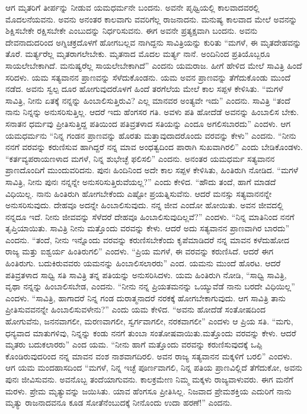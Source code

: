 ಆಗ ಮೃತರಿಗೆ ತೀರ್ಪನ್ನು ನೀಡುವ ಯಮಧರ್ಮನೇ ಬಂದನು. ಅವನೇ ಪೃಥ್ವಿಯಲ್ಲಿ ಕಾಲವಾದವರಲ್ಲಿ ಮೊದಲನೆಯವನು. ಅವನು ಅನಂತರ ಕಾಲವಾಗು ವವರಿಗೆಲ್ಲ ರಾಜನಾದನು. ಮನುಷ್ಯ ಕಾಲವಾದ ಮೇಲೆ ಅವನನ್ನು ಶಿಕ್ಷಿಸಬೇಕೇ ರಕ್ಷಿಸಬೇಕೇ ಎಂಬುದನ್ನು ನಿರ್ಧರಿಸುವನು. ಈಗ ಅವನೇ ಪ್ರತ್ಯಕ್ಷವಾಗಿ ಬಂದನು. ಅವನು ದೇವನಾದುದರಿಂದ ಅಗ್ನಿಚಕ್ರದೊಳಗೆ ಹೋಗಬಲ್ಲವ ನಾಗಿದ್ದನು ಸಾವಿತ್ರಿಯನ್ನು ಕುರಿತು “ಮಗಳೆ, ಈ ಮೃತದೇಹವನ್ನು ತೊರೆ. ಮರ್ತ್ಯರೆಲ್ಲ ಮೃತರಾಗಲೇಬೇಕು. ಮೃತನಾದ ಮೊದಲ ಮರ್ತ್ಯ ನಾನೆ. ಅಂದಿನಿಂದ ಪ್ರತಿಯೊಬ್ಬರೂ ಸಾಯಲೇಬೇಕಾಗಿದೆ. ಮನುಷ್ಯರೆಲ್ಲ ಸಾಯಲೇಬೇಕಾಗಿದೆ” ಎಂದನು ಯಮರಾಜ. ಹೀಗೆ ಹೇಳಿದ ಮೇಲೆ ಸಾವಿತ್ರಿ ಹಿಂದೆ ಸರಿದಳು. ಯಮ ಸತ್ಯವಾನನ ಪ್ರಾಣವನ್ನು ಸೆಳೆದುಕೊಂಡನು. ಯಮ ಅವನ ಪ್ರಾಣವನ್ನು ತೆಗೆದುಕೊಂಡು ಮುಂದೆ ನಡೆದ. ಅವನು ಸ್ವಲ್ಪ ದೂರ ಹೋಗುವುದರೊಳಗೆ ಹಿಂದೆ ತರಗೆಲೆಯ ಮೇಲೆ ಕಾಲ ಸಪ್ಪಳ ಕೇಳಿಸಿತು. “ಮಗಳೆ ಸಾವಿತ್ರಿ, ನೀನು ಏತಕ್ಕೆ ನನ್ನನ್ನು ಹಿಂಬಾಲಿಸುತ್ತಿರುವಿ? ಎಲ್ಲ ಮಾನವರ ಅಂತ್ಯವೇ ಇದು” ಎಂದನು. ಸಾವಿತ್ರಿ “ತಂದೆ ನಾನು ನಿನ್ನನ್ನು ಅನುಸರಿಸುತ್ತಿಲ್ಲ. ಆದರೆ ಇದು ಹೆಂಗಸರ ಗತಿ. ಅವಳು ಪತಿ ಹೋದೆಡೆ ಅವನನ್ನು ಹಿಂಬಾಲಿಸ ಬೇಕು. ಸನಾತನ ಧರ್ಮವು ಪ್ರೀತಿಸುತ್ತಿದ್ದ ಪತಿಯಿಂದ ಪತಿವ್ರತಳಾದ ಸತಿಯನ್ನು ಎಂದೂ ಅಗಲಿಸಬಾರದು” ಎಂದಳು. ಆಗ ಯಮಧರ್ಮನು “ನಿನ್ನ ಗಂಡನ ಪ್ರಾಣವನ್ನು ಹೊರತು ಮತ್ತಾವುದಾದರೊಂದು ವರವನ್ನು ಕೇಳು” ಎಂದನು. “ನೀನು ನನಗೆ ವರವನ್ನು ಕರುಣಿಸುವ ಹಾಗಿದ್ದರೆ ನನ್ನ ಮಾವ ಅಂಧತ್ವದಿಂದ ಪಾರಾಗಿ ಸುಖವಾಗಿರಲಿ” ಎಂದು ಬೇಡಿಕೊಂಡಳು. “ಕರ್ತವ್ಯಪರಾಯಣಳಾದ ಮಗಳೆ, ನಿನ್ನ ಶುಭೇಚ್ಛೆ ಫಲಿಸಲಿ” ಎಂದನು. ಅನಂತರ ಯಮಧರ್ಮ ಸತ್ಯವಾನನ ಪ್ರಾಣದೊಂದಿಗೆ ಮುಂದುವರಿದನು. ಪುನಃ ಹಿಂದಿನಿಂದ ಅದೇ ಕಾಲ ಸಪ್ಪಳ ಕೇಳಿಸಿತು, ಹಿಂತಿರುಗಿ ನೋಡಿದ. “ಮಗಳೆ ಸಾವಿತ್ರಿ, ನೀನು ಪುನಃ ನನ್ನನ್ನೇ ಅನುಸರಿಸುತ್ತಿರುವೆಯಲ್ಲ?” ಎಂದು ಕೇಳಿದ. “ಹೌದು ತಂದೆ, ಹಾಗೆ ಮಾಡದೆ ವಿಧಿಯಿಲ್ಲ. ನಾನು ಹಿಂತಿರುಗಿ ಹೋಗಬೇಕೆಂದು ಎಷ್ಟೋ ಪ್ರಯತ್ನಿಸುವೆನು. ಆದರೆ ಮನಸ್ಸು ಸತ್ಯವಾನನನ್ನೇ ಅನುಸರಿಸುವುದು. ದೇಹವೂ ಅದನ್ನೇ ಹಿಂಬಾಲಿಸುವುದು. ನನ್ನ ಜೀವ ಎಂದೋ ಹೋಯಿತು. ಅವನ ಜೀವದಲ್ಲಿ ನನ್ನದೂ ಇದೆ. ನೀನು ಜೀವವನ್ನು ಸೆಳೆದರೆ ದೇಹವೂ ಹಿಂಬಾಲಿಸುವುದಿಲ್ಲವೆ?” ಎಂದಳು. “ನಿನ್ನ ಮಾತಿನಿಂದ ನನಗೆ ತೃಪ್ತಿಯಾಯಿತು. ಸಾವಿತ್ರಿ ನೀನು ಮತ್ತೊಂದು ವರವನ್ನು ಕೇಳು. ಆದರೆ ಅದು ಸತ್ಯವಾನನ ಪ್ರಾಣವಾಗಿರ ಬಾರದು” ಎಂದನು. “ತಂದೆ, ನೀನು ಇನ್ನೊಂದು ವರವನ್ನು ಕರುಣಿಸಬೇಕೆಂದು ಕೃಪೆಮಾಡಿದರೆ ನನ್ನ ಮಾವನ ಕಳೆದುಹೋದ ರಾಜ್ಯ ಮತ್ತು ಐಶ್ವರ್ಯ ಹಿಂತಿರುಗಲಿ” ಎಂದಳು. “ಪ್ರಿಯ ಮಗಳೆ, ಈ ವರವನ್ನು ಕರುಣಿಸಿದೆ. ಆದರೆ ಈಗ ಹಿಂತಿರುಗು. ಬದುಕಿರುವವರು ಯಮನನ್ನು ಹಿಂಬಾಲಿಸಲಾರರು” ಎಂದ. ಯಮನು ಮುಂದೆ ಹೊರಟ. ಆದರೆ ಪತಿವ್ರತಳಾದ ಸಾಧ್ವಿ ಸತಿ ಸಾವಿತ್ರಿ ತನ್ನ ಪತಿಯನ್ನು ಅನುಸರಿಸಿದಳು. ಯಮ ಹಿಂತಿರುಗಿ ನೋಡಿ, “ಸಾಧ್ವಿ ಸಾವಿತ್ರಿ, ವೃಥಾ ನನ್ನನ್ನು ಹಿಂಬಾಲಿಸಬೇಡ, ಎಂದನು. “ನೀನು ನನ್ನ ಪ್ರಿಯತಮನನ್ನು ಒಯ್ಯುವೆಡೆ ನಾನು ಬರದೇ ವಿಧಿಯಿಲ್ಲ” ಎಂದಳು. “ಸಾವಿತ್ರಿ, ಹಾಗಾದರೆ ನಿನ್ನ ಗಂಡ ದುರಾತ್ಮನಾದರೆ ನರಕಕ್ಕೆ ಹೋಗಬೇಕಾಗುವುದು. ಆಗ ಸಾವಿತ್ರಿ ತಾನು ಪ್ರೀತಿಸುವವನನ್ನೇ ಹಿಂಬಾಲಿಸುವಳೇನು?” ಎಂದು ಯಮ ಕೇಳಿದ. “ಅವನು ಹೋದೆಡೆ ಸಂತೋಷದಿಂದ ಹೋಗುವೆನು, ಜನನವಾಗಲೀ, ಮರಣವಾಗಲೀ, ಸ್ವರ್ಗವಾಗಲೀ, ನರಕವಾಗಲೀ” ಎಂದಳು ಆ ಪ್ರಿಯ ಸತಿ. “ಮಗು, ಧನ್ಯವಾದ ಮಾತುಗಳಿವು, ನಿನ್ನನ್ನು ಕಂಡು ನನಗೆ ತುಂಬಾ ಸಂತೋಷವಾಯಿತು.ಮತ್ತೊಂದು ವರವನ್ನು ಕೇಳು. ಆದರೆ ಮೃತರು ಬದುಕಲಾರರು” ಎಂದ ಯಮ. “ನೀನು ಹಾಗೆ ಮತ್ತೊಂದು ವರವನ್ನು ಕರುಣಿಸುವುದಕ್ಕೆ ಒಪ್ಪಿ ಕೊಂಡಿರುವುದರಿಂದ ನನ್ನ ಮಾವನ ವಂಶ ನಾಶವಾಗದಿರಲಿ. ಅವನ ರಾಜ್ಯ ಸತ್ಯವಾನನ ಮಕ್ಕಳಿಗೆ ಬರಲಿ” ಎಂದಳು. ಆಗ ಯಮ ಮಂದಹಾಸದಿಂದ “ಮಗಳೆ, ನಿನ್ನ ಇಚ್ಛೆ ಪೂರ್ಣವಾಗಲಿ, ನಿನ್ನ ಪತಿಯ ಪ್ರಾಣವಿಲ್ಲಿದೆ ತೆಗೆದುಕೋ, ಅವನು ಪುನಃ ಜೀವಿಸುವನು. ಅವನೊಬ್ಬ ತಂದೆಯಾಗುವನು. ಕಾಲಕ್ರಮೇಣ ನಿಮ್ಮ ಮಕ್ಕಳು ರಾಜ್ಯವಾಳುವರು. ಈಗ ಮನೆಗೆ ಮರಳು. ಪ್ರೇಮ ಮೃತ್ಯುವನ್ನು ಜಯಿಸಿತು. ಯಾವ ಹೆಂಗಸೂ ಪ್ರೀತಿಸಿಲ್ಲ. ನಿಜವಾದ ಪ್ರೇಮಶಕ್ತಿಯ ಎದುರಿಗೆ ನಾನು ಮೃತ್ಯು ರಾಜನಾದವನೂ ಕೂಡ ಸೋತೆನೆಂಬುದಕ್ಕೆ ನೀನೊಂದು ಉದಾ ಹರಣೆ!” ಎಂದನು.

